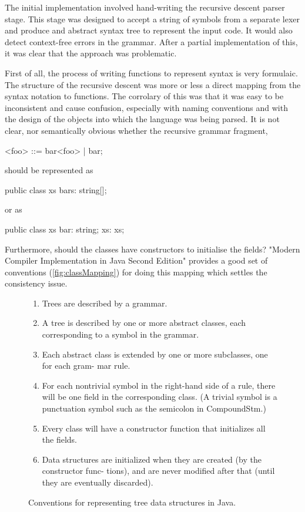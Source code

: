 \documentclass{article}
\begin{document}
The initial implementation involved hand-writing the recursive descent parser stage. This stage was designed to accept a string of symbols from a separate lexer and produce and abstract syntax tree to represent the input code. It would also detect context-free errors in the grammar. After a partial implementation of this, it was clear that the approach was problematic.

First of all, the process of writing functions to represent syntax is very formulaic. The structure of the recursive descent was more or less a direct mapping from the syntax notation to functions. The corrolary of this was that it was easy to be inconsistent and cause confusion, especially with naming conventions and with the design of the objects into which the language was being parsed. It is not clear, nor semantically obvious whether the recursive grammar fragment,

<foo> ::= bar<foo> | bar;

should be represented as

public class xs {
	bars: string[];
}

or as 

public class xs {
	bar: string;
	xs: xs;
}

Furthermore, should the classes have constructors to initialise the fields? "Modern Compiler Implementation in Java Second Edition" provides a good set of conventions (\ref{fig:classMapping}) for doing this mapping which settles the consistency issue. 


\begin{figure}
\begin{enumerate}
\item Trees are described by a grammar.
\item A tree is described by one or more abstract classes, each corresponding to a
symbol in the grammar.
\item Each abstract class is extended by one or more subclasses, one for each gram-
mar rule.
\item For each nontrivial symbol in the right-hand side of a rule, there will be one field in the corresponding class. (A trivial symbol is a punctuation symbol such as the semicolon in CompoundStm.)
\item Every class will have a constructor function that initializes all the fields.
\item Data structures are initialized when they are created (by the constructor func-
tions), and are never modified after that (until they are eventually discarded).
\end{enumerate}
\caption{Conventions for representing tree data structures in Java. \cite{11270520020101}}
\label{classMapping}
\end{figure}
\end{document}
